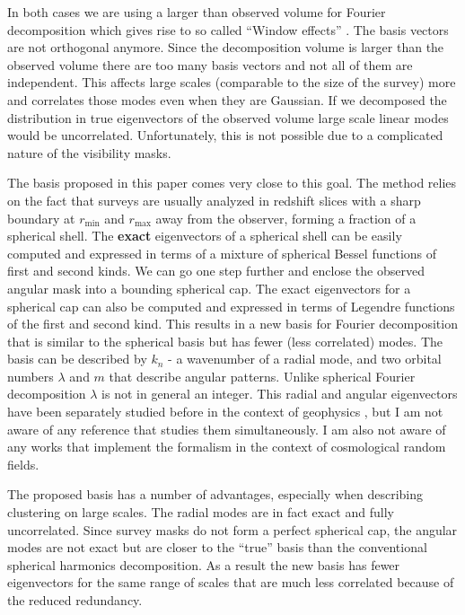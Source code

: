 \documentclass[fleqn,usenatbib]{mnras}
\newcommand{\rmin}{r_\mathrm{min}}
\newcommand{\rmax}{r_\mathrm{max}}
\begin{document}
In both cases we are using a larger than observed volume for Fourier
decomposition which gives rise to so called ``Window effects''
\citep[see e.g.,][]{2017MNRAS.464.3121W}. The basis vectors are not orthogonal anymore.
Since the decomposition volume is larger than the observed volume there are too
many basis vectors and not all of them are independent. This affects large
scales (comparable to the size of the survey) more and correlates those modes
even when they are Gaussian. If we decomposed the distribution in true
eigenvectors of the observed volume large scale linear modes would be
uncorrelated. Unfortunately, this is not possible due to a complicated nature
of the visibility masks.

The basis proposed in this paper comes very close to this goal. The method
relies on the fact that surveys are usually analyzed in redshift slices with a
sharp boundary at $\rmin$ and $\rmax$ away from the observer, forming a
fraction of a spherical shell. The \textbf{exact} eigenvectors of a spherical
shell can be easily computed and expressed in terms of a mixture of spherical
Bessel functions of first and second kinds. We can go one step further and
enclose the observed angular mask into a bounding spherical cap. The exact
eigenvectors for a spherical cap can also be computed and expressed in terms of
Legendre functions of the first and second kind. This results in a new basis
for Fourier decomposition that is similar to the spherical basis but has fewer
(less correlated) modes. The basis can be described by $k_n$ - a wavenumber of
a radial mode, and two orbital numbers $\lambda$ and $m$ that describe angular
patterns. Unlike spherical Fourier decomposition $ \lambda$ is not in general 
an integer. This radial and angular eigenvectors have been separately
studied before in the context of geophysics
\citep{1985JGR....90.2583H,2006JGRB..111.1102T,Mushref2010}, but I am not aware
of any reference that studies them simultaneously. I am also not aware of any
works that implement the formalism in the context of cosmological random
fields.

The proposed basis has a number of advantages, especially when describing
clustering on large scales. The radial modes are in fact exact and fully
uncorrelated. Since survey masks do not form a perfect spherical cap, the
angular modes are not exact but are closer to the ``true'' basis than the
conventional spherical harmonics decomposition. As a result the new basis has
fewer eigenvectors for the same range of scales that are much less correlated
because of the reduced redundancy.
\end{document}
